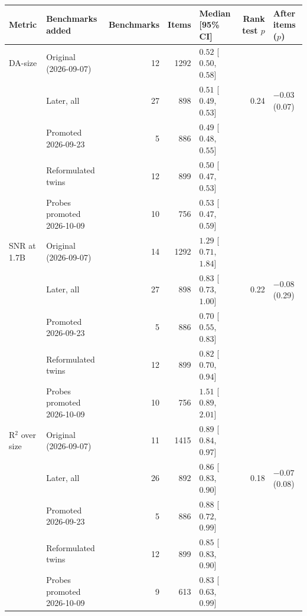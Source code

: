 \begin{tabular}{llrrlrl}
\toprule
Metric & Benchmarks added & Benchmarks & Items & Median [95\% CI] & Rank test $p$ & After items ($p$) \\
\midrule
DA-size & Original (2026-09-07) & 12 & 1292 & $0.52$ [$0.50$, $0.58$] &  &  \\
 & Later, all & 27 & 898 & $0.51$ [$0.49$, $0.53$] & 0.24 & $-0.03$ (0.07) \\
 & \quad Promoted 2026-09-23 & 5 & 886 & $0.49$ [$0.48$, $0.55$] &  &  \\
 & \quad Reformulated twins & 12 & 899 & $0.50$ [$0.47$, $0.53$] &  &  \\
 & \quad Probes promoted 2026-10-09 & 10 & 756 & $0.53$ [$0.47$, $0.59$] &  &  \\
\midrule
SNR at 1.7B & Original (2026-09-07) & 14 & 1292 & $1.29$ [$0.71$, $1.84$] &  &  \\
 & Later, all & 27 & 898 & $0.83$ [$0.73$, $1.00$] & 0.22 & $-0.08$ (0.29) \\
 & \quad Promoted 2026-09-23 & 5 & 886 & $0.70$ [$0.55$, $0.83$] &  &  \\
 & \quad Reformulated twins & 12 & 899 & $0.82$ [$0.70$, $0.94$] &  &  \\
 & \quad Probes promoted 2026-10-09 & 10 & 756 & $1.51$ [$0.89$, $2.01$] &  &  \\
\midrule
R$^2$ over size & Original (2026-09-07) & 11 & 1415 & $0.89$ [$0.84$, $0.97$] &  &  \\
 & Later, all & 26 & 892 & $0.86$ [$0.83$, $0.90$] & 0.18 & $-0.07$ (0.08) \\
 & \quad Promoted 2026-09-23 & 5 & 886 & $0.88$ [$0.72$, $0.99$] &  &  \\
 & \quad Reformulated twins & 12 & 899 & $0.85$ [$0.83$, $0.90$] &  &  \\
 & \quad Probes promoted 2026-10-09 & 9 & 613 & $0.83$ [$0.63$, $0.99$] &  &  \\
\bottomrule
\end{tabular}
